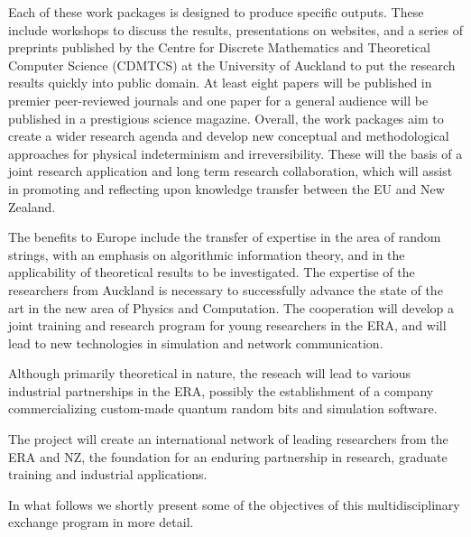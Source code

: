 \documentclass[12pt]{article}
\begin{document}
Each of these work packages is designed to produce specific outputs.
These include workshops to discuss the results, presentations on websites,
and a series of preprints published by the Centre for Discrete Mathematics and Theoretical Computer Science (CDMTCS)
at the University of Auckland  to put the research
results quickly into public domain. At least eight papers will be published in premier
peer-reviewed journals and one paper for a general audience will be published in a prestigious science magazine.
Overall, the work packages aim to create a wider research agenda and
develop new conceptual and methodological approaches for physical indeterminism and irreversibility.
These will the basis of a joint research application and long term research collaboration,
which will assist in promoting and reflecting upon knowledge transfer between the EU and New Zealand.

The benefits to Europe include the transfer of expertise in the area of random strings,
with an emphasis on algorithmic information theory, and in the applicability of  theoretical results to be investigated.
The expertise of the researchers from Auckland is necessary to successfully advance the state of the art in the new area of Physics and Computation.  The cooperation will develop
a joint training and research program for young researchers in the ERA, and will lead to new technologies in simulation and network communication.


 Although primarily theoretical in nature, the reseach will lead to various industrial partnerships   in the ERA, possibly
 the establishment of a company
commercializing custom-made quantum random bits and simulation software.


The project will create an international network of leading researchers
from the ERA and NZ, the foundation for an
enduring partnership in research, graduate training and industrial applications.

In what follows we shortly present some of the objectives of this multidisciplinary exchange program
in more detail.
\end{document}
